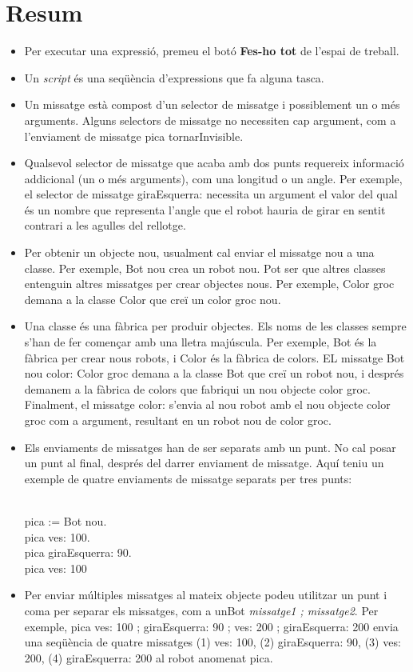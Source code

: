 \section{Resum}

\begin{itemize}
\item Per executar una expressió, premeu el botó \textbf{Fes-ho tot} de l'espai de treball.
\item Un \emph{script} és una seqüència d'expressions que fa alguna tasca.
\item Un missatge està compost d'un selector de missatge i possiblement un o més arguments. Alguns selectors de missatge no necessiten cap argument, com a l'enviament de missatge \textsf{pica tornarInvisible}.
\item Qualsevol selector de missatge que acaba amb dos punts requereix informació addicional (un o més arguments), com una longitud o un angle. Per exemple, el selector de missatge \textsf{giraEsquerra:} necessita un argument el valor del qual és un nombre que representa l'angle que el robot hauria de girar en sentit contrari a les agulles del rellotge.
\item Per obtenir un objecte nou, usualment cal enviar el missatge \textsf{nou} a una classe. Per exemple, \textsf{Bot nou} crea un robot nou. Pot ser que altres classes entenguin altres missatges per crear objectes nous. Per exemple, \textsf{Color groc} demana a la classe \textsf{Color} que creï un color groc nou.
\item Una classe és una fàbrica per produir objectes. Els noms de les classes sempre s'han de fer començar amb una lletra majúscula. Per exemple, \textsf{Bot} és la fàbrica per crear nous robots, i \textsf{Color} és la fàbrica de colors. EL missatge \textsf{Bot nou color: Color groc} demana a la classe \textsf{Bot}  que creï un robot nou, i després demanem a la fàbrica de colors que fabriqui un nou objecte color groc. Finalment, el missatge \textsf{color:} s'envia al nou robot amb el nou objecte color groc com a argument, resultant en un robot nou de color groc.
\item Els enviaments de missatges han de ser separats amb un punt. No cal posar un punt al final, després del darrer enviament de missatge. Aquí teniu un exemple de quatre enviaments de missatge separats per tres punts:

\noindent
\textsf{\upshape
\\
pica := Bot nou.\\
pica ves: 100.\\
pica giraEsquerra: 90.\\
pica ves: 100\\
}
\item Per enviar múltiples missatges al mateix objecte podeu utilitzar un punt i coma per separar els missatges, com a \textsf{unBot} \emph{missatge1 ; missatge2}. Per exemple, \textsf{pica ves: 100 ; giraEsquerra: 90 ; ves: 200 ; giraEsquerra: 200} envia una seqüència de quatre missatges (1) \textsf{ves: 100}, (2) \textsf{giraEsquerra: 90}, (3) \textsf{ves: 200}, (4) \textsf{giraEsquerra: 200} al robot anomenat \textsf{pica}.
\end{itemize}

